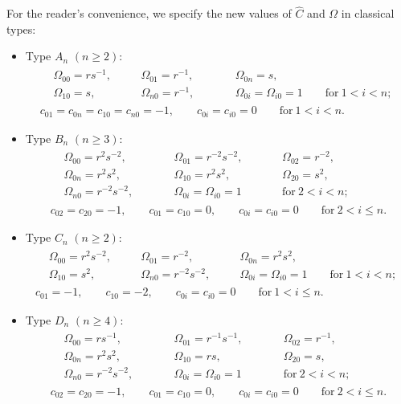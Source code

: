 \documentclass[10pt,a4paper]{amsart}
\numberwithin{equation}{section}
\begin{document}
\begin{Remark}
For the reader's convenience, we specify the new values of $\hat{C}$ and $\Omega$ in classical types:
\begin{itemize}\itemsep=0pt
\item Type $A_{n}$ $(n\geq 2)$:
\begin{gather*}
\begin{aligned}
 &\Omega_{00}=rs^{-1},\quad&& \Omega_{01}=r^{-1},\qquad&& \Omega_{0n}=s, \\
 &\Omega_{10}=s,\quad&& \Omega_{n0}=r^{-1}, \qquad&& \Omega_{0i}=\Omega_{i0}=1\qquad \text{for}\ 1<i<n;
 \end{aligned}
\\
c_{01}=c_{0n}=c_{10}=c_{n0}=-1,\qquad c_{0i}=c_{i0}=0 \qquad \text{for}\ 1<i<n.
\end{gather*}

\item Type $B_n$ $(n\geq 3)$:
\begin{gather*}
\begin{aligned}
 &\Omega_{00}=r^2s^{-2} ,\qquad&& \Omega_{01}=r^{-2}s^{-2} , \quad&& \Omega_{02}=r^{-2} , \\
 &\Omega_{0n}=r^2s^2 ,\qquad &&\Omega_{10}=r^2s^2 , \quad&& \Omega_{20}=s^2 ,\\
 & \Omega_{n0}=r^{-2}s^{-2} ,\qquad&& \Omega_{0i}=\Omega_{i0}=1 \qquad&& \text{for}\ 2<i<n;
 \end{aligned}
\\
 c_{02}=c_{20}=-1 , \qquad c_{01}=c_{10}=0 , \qquad c_{0i}=c_{i0}=0 \qquad\text{for}\ 2<i\leq n .
\end{gather*}

\item Type $C_n$ $(n\geq 2)$:
\begin{gather*}
\begin{aligned}
 &\Omega_{00}=r^2s^{-2}, \quad&& \Omega_{01}=r^{-2},\quad&& \Omega_{0n}=r^2s^2,\\
 & \Omega_{10}=s^2, \quad&& \Omega_{n0}=r^{-2}s^{-2} , \quad&& \Omega_{0i}=\Omega_{i0}=1 \qquad \text{for}\ 1<i<n ;
 \end{aligned}
\\
 c_{01}=-1,\qquad c_{10}=-2 , \qquad c_{0i}=c_{i0}=0 \qquad \text{for}\ 1<i\leq n .
\end{gather*}

\item Type $D_n$ $(n\geq 4)$:
\begin{gather*}
\begin{aligned}
 &\Omega_{00}=rs^{-1},\qquad&& \Omega_{01}=r^{-1}s^{-1},\qquad&& \Omega_{02}=r^{-1},\\
 &\Omega_{0n}=r^2s^2, \qquad&& \Omega_{10}=rs,\qquad&& \Omega_{20}=s,\\
 &\Omega_{n0}=r^{-2}s^{-2} , \qquad&& \Omega_{0i}=\Omega_{i0}=1 \qquad&& \text{for}\ 2<i<n ;
 \end{aligned}
\\
 c_{02}=c_{20}=-1 ,\qquad c_{01}=c_{10}=0 , \qquad c_{0i}=c_{i0}=0 \qquad \text{for}\ 2<i\leq n .
\end{gather*}
\end{itemize}
\end{Remark}
\end{document}

